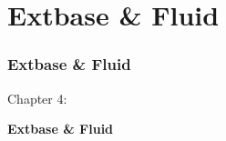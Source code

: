 %

\section{Extbase \& Fluid}
\begin{frame}[fragile]
	\frametitle{Extbase \& Fluid}

	\begin{center}\huge{Chapter 4:}\end{center}
	\begin{center}\huge{\color{typo3darkgrey}\textbf{Extbase \& Fluid}}\end{center}

\end{frame}


